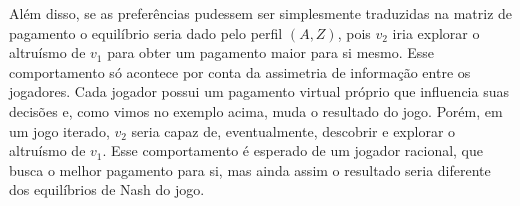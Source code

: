 Além disso, se as preferências pudessem ser simplesmente traduzidas na matriz de pagamento o equilíbrio seria dado pelo perfil $(A,Z)$, pois $v_2$ iria explorar o altruísmo de $v_1$ para obter um pagamento maior para si mesmo. Esse comportamento só acontece por conta da assimetria de informação entre os jogadores. Cada jogador possui um pagamento virtual próprio que influencia suas decisões e, como vimos no exemplo acima, muda o resultado do jogo. Porém, em um jogo iterado, $v_2$ seria capaz de, eventualmente, descobrir e explorar o altruísmo de $v_1$. Esse comportamento é esperado de um jogador racional, que busca o melhor pagamento para si, mas ainda assim o resultado seria diferente dos equilíbrios de Nash do jogo.
